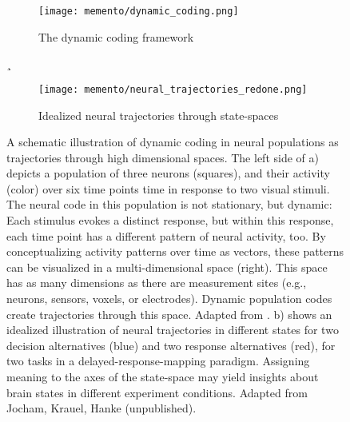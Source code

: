 \begin{figure}[H]
	\begin{subfigure}{\textwidth}
		\centering
		\texttt{[image: memento/dynamic\_coding.png]}
		\caption {The dynamic coding framework}
		\label{fig:dynamiccoding}
	\end{subfigure}
	\hfill¸
	\begin{subfigure}{\textwidth}
		\centering
		\texttt{[image: memento/neural\_trajectories\_redone.png]}
		\caption{Idealized neural trajectories through state-spaces}
		\label{fig:trajectories}
	\end{subfigure}
	\caption[Dynamic coding and neural trajectories in the study of brain states]{A schematic illustration of dynamic coding in neural populations as trajectories through high dimensional spaces. The left side of a) depicts a population of three neurons (squares), and their activity (color) over six time points time in response to two visual stimuli. The neural code in this population is not stationary, but dynamic: Each stimulus evokes a distinct response, but within this response, each time point has a different pattern of neural activity, too. By conceptualizing activity patterns over time as vectors, these patterns can be visualized in a multi-dimensional space (right). This space has as many dimensions as there are measurement sites (e.g., neurons, sensors, voxels, or electrodes). Dynamic population codes create trajectories through this space. Adapted from \citet[][Fig. 2]{meyers2018dynamic}. b) shows an idealized illustration of neural trajectories in different states for two decision alternatives (blue) and two response alternatives (red), for two tasks in a delayed-response-mapping paradigm. Assigning meaning to the axes of the state-space may yield insights about brain states in different experiment conditions. Adapted from Jocham, Krauel, Hanke (unpublished).}
	\label{fig:brainstates}
\end{figure}


